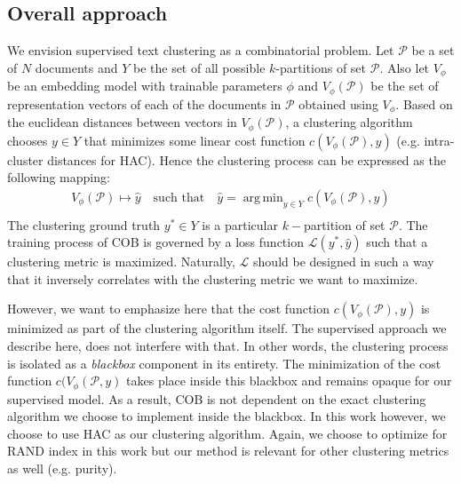 \documentclass[11pt,a4paper]{article}
\DeclareMathOperator*{\argmin}{arg\,min}
\begin{document}
\subsection{Overall approach}\label{sec:app} We envision supervised text clustering as a combinatorial problem. Let $\mathcal{P}$ be a set of $N$ documents and $Y$ be the set of all possible $k$-partitions of set $\mathcal{P}$. Also let $V_\phi$ be an embedding model with trainable parameters $\phi$ and $V_\phi(\mathcal{P})$ be the set of representation vectors of each of the documents in $\mathcal{P}$ obtained using $V_\phi$. Based on the euclidean distances between vectors in $V_\phi(\mathcal{P})$, a clustering algorithm chooses $y \in Y$ that minimizes some linear cost function $c(V_\phi(\mathcal{P}), y)$ (e.g. intra-cluster distances for HAC). Hence the clustering process can be expressed as the following mapping:
\begin{align*}
V_\phi(\mathcal{P}) \mapsto \hat{y} \quad \textrm{such that} \quad \hat{y} = \argmin_{y \in Y} c(V_\phi(\mathcal{P}), y) \\ 
\end{align*}
The clustering ground truth $y^* \in Y$ is a particular $k-$partition of set $\mathcal{P}$. The training process of COB is governed by a loss function $\mathcal{L}(y^*,\hat{y})$ such that a clustering metric is maximized. Naturally, $\mathcal{L}$ should be designed in such a way that it inversely correlates with the clustering metric we want to maximize.

However, we want to emphasize here that the cost function $c(V_\phi(\mathcal{P}), y)$ is minimized as part of the clustering algorithm itself. The supervised approach we describe here, does not interfere with that. In other words, the clustering process is isolated as a \textit{blackbox} component in its entirety. The minimization of the cost function $c(V_\phi(\mathcal{P}, y)$ takes place inside this blackbox and remains opaque for our supervised model. As a result, COB is not dependent on the exact clustering algorithm we choose to implement inside the blackbox. In this work however, we choose to use HAC as our clustering algorithm. Again, we choose to optimize for RAND index in this work but our method is relevant for other clustering metrics as well (e.g. purity).
\end{document}
